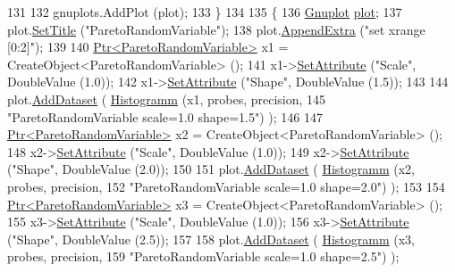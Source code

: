 \begin{DoxyCode}
131 
132     gnuplots.AddPlot (plot);
133   \}
134 
135   \{
136     \hyperlink{classns3_1_1Gnuplot}{Gnuplot} \hyperlink{lte__amc_8m_a5942306abe9f005572e4344e3cdef528}{plot};
137     plot.\hyperlink{classns3_1_1Gnuplot_ac01f15633d49f0239f8a45293a1e04f0}{SetTitle} (\textcolor{stringliteral}{"ParetoRandomVariable"});
138     plot.\hyperlink{classns3_1_1Gnuplot_a649a3041b9d0ea21a212b5ad9b28ecbf}{AppendExtra} (\textcolor{stringliteral}{"set xrange [0:2]"});
139 
140     \hyperlink{classns3_1_1Ptr}{Ptr<ParetoRandomVariable>} x1 = CreateObject<ParetoRandomVariable> ();
141     x1->\hyperlink{classns3_1_1ObjectBase_ac60245d3ea4123bbc9b1d391f1f6592f}{SetAttribute} (\textcolor{stringliteral}{"Scale"}, DoubleValue (1.0));
142     x1->\hyperlink{classns3_1_1ObjectBase_ac60245d3ea4123bbc9b1d391f1f6592f}{SetAttribute} (\textcolor{stringliteral}{"Shape"}, DoubleValue (1.5));
143 
144     plot.\hyperlink{classns3_1_1Gnuplot_a306ec724a327cf9ab699700f31fca0a1}{AddDataset} ( \hyperlink{main-random-variable-stream_8cc_a2cfd3837ab3f2e816cf53486d7a186b5}{Histogramm} (x1, probes, precision,
145                                   \textcolor{stringliteral}{"ParetoRandomVariable scale=1.0 shape=1.5"}) );
146 
147     \hyperlink{classns3_1_1Ptr}{Ptr<ParetoRandomVariable>} x2 = CreateObject<ParetoRandomVariable> ();
148     x2->\hyperlink{classns3_1_1ObjectBase_ac60245d3ea4123bbc9b1d391f1f6592f}{SetAttribute} (\textcolor{stringliteral}{"Scale"}, DoubleValue (1.0));
149     x2->\hyperlink{classns3_1_1ObjectBase_ac60245d3ea4123bbc9b1d391f1f6592f}{SetAttribute} (\textcolor{stringliteral}{"Shape"}, DoubleValue (2.0));
150 
151     plot.\hyperlink{classns3_1_1Gnuplot_a306ec724a327cf9ab699700f31fca0a1}{AddDataset} ( \hyperlink{main-random-variable-stream_8cc_a2cfd3837ab3f2e816cf53486d7a186b5}{Histogramm} (x2, probes, precision,
152                                   \textcolor{stringliteral}{"ParetoRandomVariable scale=1.0 shape=2.0"}) );
153 
154     \hyperlink{classns3_1_1Ptr}{Ptr<ParetoRandomVariable>} x3 = CreateObject<ParetoRandomVariable> ();
155     x3->\hyperlink{classns3_1_1ObjectBase_ac60245d3ea4123bbc9b1d391f1f6592f}{SetAttribute} (\textcolor{stringliteral}{"Scale"}, DoubleValue (1.0));
156     x3->\hyperlink{classns3_1_1ObjectBase_ac60245d3ea4123bbc9b1d391f1f6592f}{SetAttribute} (\textcolor{stringliteral}{"Shape"}, DoubleValue (2.5));
157 
158     plot.\hyperlink{classns3_1_1Gnuplot_a306ec724a327cf9ab699700f31fca0a1}{AddDataset} ( \hyperlink{main-random-variable-stream_8cc_a2cfd3837ab3f2e816cf53486d7a186b5}{Histogramm} (x3, probes, precision,
159                                   \textcolor{stringliteral}{"ParetoRandomVariable scale=1.0 shape=2.5"}) );

\end{DoxyCode}
